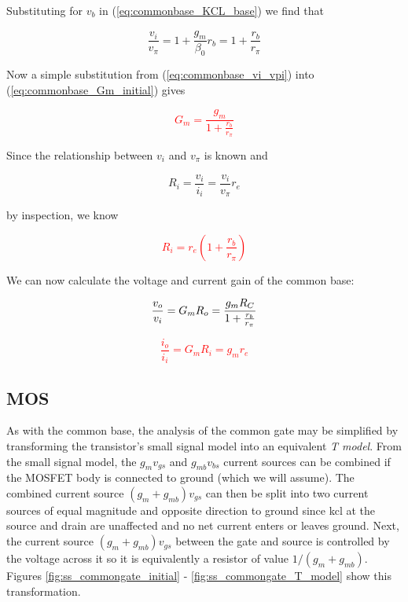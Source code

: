 Substituting for $v_{b}$ in (\ref{eq:commonbase_KCL_base}) we find that

\begin{equation}
\frac{v_{i}}{v_{\pi}} = 1 + \frac{g_{m}}{\beta_{0}}r_{b} = 1 + \frac{r_{b}}{r_{\pi}}
\label{eq:commonbase_vi_vpi}
\end{equation}

Now a simple substitution from (\ref{eq:commonbase_vi_vpi}) into (\ref{eq:commonbase_Gm_initial}) gives \autocite[185]{analysis-design-analog-ics}

\textcolor{red}{
\begin{equation}
G_{m} = \frac{g_{m}}{1+\frac{r_{b}}{r_{\pi}}}
\end{equation}
}

Since the relationship between $v_{i}$ and $v_{\pi}$ is known and

\begin{equation}
R_{i} = \frac{v_{i}}{i_{i}} = \frac{v_{i}}{v_{\pi}}r_{e}
\end{equation}

by inspection, we know

\textcolor{red}{
\begin{equation}
R_{i} = r_{e}\left(1 + \frac{r_{b}}{r_{\pi}}\right)
\end{equation}
}

We can now calculate the voltage and current gain of the common base:

\textcolor{red}{
\begin{equation}
\frac{v_o}{v_i} = G_{m}R_{o} = \frac{g_{m}R_{C}}{1+\frac{r_{b}}{r_{\pi}}}
\end{equation}
}

\textcolor{red}{
\begin{equation}
\frac{i_{o}}{i_{i}} = G_{m}R_{i} = g_{m}r_{e}
\end{equation}
}

\subsection{MOS}
As with the common base, the analysis of the common gate may be simplified by transforming the transistor's small signal model into an equivalent \textsl{T model}.
From the small signal model, the $g_{m}v_{gs}$ and $g_{mb}v_{bs}$ current sources can be combined if the MOSFET body is connected to ground (which we will assume).
The combined current source $(g_{m}+g_{mb})v_{gs}$ can then be split into two current sources of equal magnitude and opposite direction to ground since \ac{kcl} at the source and drain are unaffected and no net current enters or leaves ground.
Next, the current source $(g_{m}+g_{mb})v_{gs}$ between the gate and source is controlled by the voltage across it so it is equivalently a resistor of value $1/(g_{m}+g_{mb})$.
Figures \ref{fig:ss_commongate_initial} - \ref{fig:ss_commongate_T_model} show this transformation. \autocite[186]{analysis-design-analog-ics}

